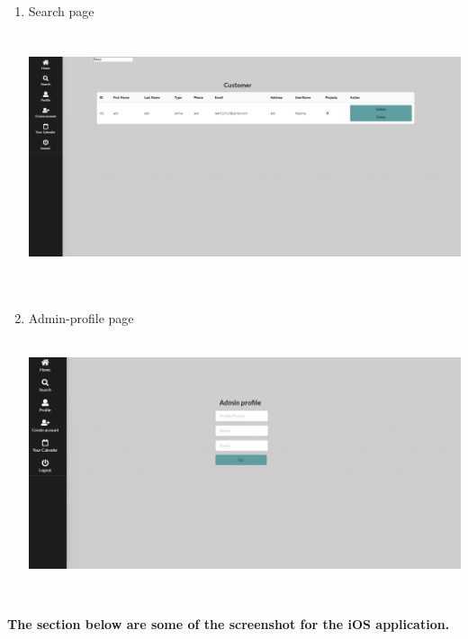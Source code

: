 \documentclass[onecolumn, draftclsnofoot,10pt, compsoc]{IEEEtran}
\begin{document}
\begin{enumerate}
    
  \item Search page\newline\newline
\includegraphics[width=13cm, height=8cm]{web-search-page.png}\newline
\newpage
\item Admin-profile page\newline\newline
\includegraphics[width=13cm, height=8cm]{web-admin-profile-page.png}\newline
 
\end{enumerate}
\newpage
\textbf{The section below are some of the screenshot for the iOS application. } \newline
\end{document}
